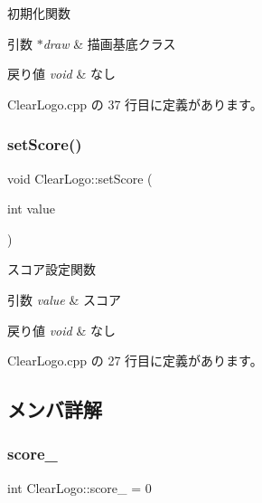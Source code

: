 初期化関数 


\begin{DoxyParams}{引数}
{\em $\ast$draw} & 描画基底クラス \\
\hline
\end{DoxyParams}

\begin{DoxyRetVals}{戻り値}
{\em void} & なし \\
\hline
\end{DoxyRetVals}


 Clear\+Logo.\+cpp の 37 行目に定義があります。

\mbox{\label{class_clear_logo_a6c4fd6460e479d7b9c970fd775735807}} 
\subsubsection{\texorpdfstring{set\+Score()}{setScore()}}
{\footnotesize\ttfamily void Clear\+Logo\+::set\+Score (\begin{DoxyParamCaption}\item[{int}]{value }\end{DoxyParamCaption})}



スコア設定関数 


\begin{DoxyParams}{引数}
{\em value} & スコア \\
\hline
\end{DoxyParams}

\begin{DoxyRetVals}{戻り値}
{\em void} & なし \\
\hline
\end{DoxyRetVals}


 Clear\+Logo.\+cpp の 27 行目に定義があります。



\subsection{メンバ詳解}
\mbox{\label{class_clear_logo_ab56bfb1e5656143da26cd4c841b67e5f}} 
\subsubsection{\texorpdfstring{score\+\_\+}{score\_}}
{\footnotesize\ttfamily int Clear\+Logo\+::score\+\_\+ = 0\hspace{0.3cm}{\ttfamily [private]}}



